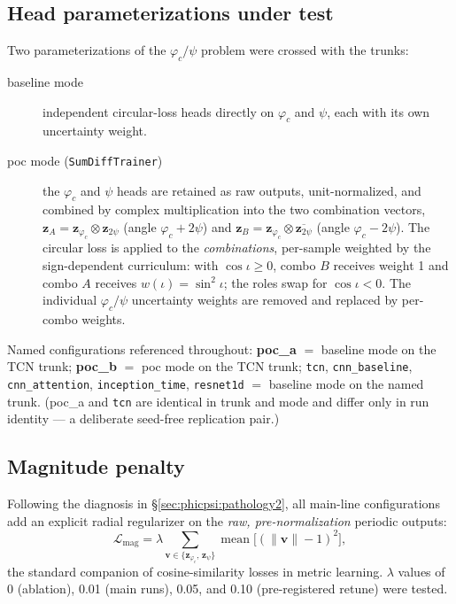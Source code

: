 \documentclass[11pt]{article}
\begin{document}
\subsection{Head parameterizations under test}
\label{sec:phicpsi:modes}

Two parameterizations of the $\varphi_c/\psi$ problem were crossed with the trunks:
\begin{description}
\item[baseline mode] independent circular-loss heads directly on $\varphi_c$ and $\psi$, each with its own uncertainty weight.
\item[poc mode (\texttt{SumDiffTrainer})] the $\varphi_c$ and $\psi$ heads are retained as raw outputs, unit-normalized, and combined by complex multiplication into the two combination vectors, $\mathbf{z}_A = \mathbf{z}_{\varphi_c} \otimes \mathbf{z}_{2\psi}$ (angle $\varphi_c + 2\psi$) and $\mathbf{z}_B = \mathbf{z}_{\varphi_c} \otimes \overline{\mathbf{z}_{2\psi}}$ (angle $\varphi_c - 2\psi$).
The circular loss is applied to the \emph{combinations}, per-sample weighted by the sign-dependent curriculum: with $\cos\iota \ge 0$, combo $B$ receives weight 1 and combo $A$ receives $w(\iota) = \sin^2\iota$; the roles swap for $\cos\iota < 0$.
The individual $\varphi_c/\psi$ uncertainty weights are removed and replaced by per-combo weights.
\end{description}

Named configurations referenced throughout: \textbf{poc\_a} $=$ baseline mode on the TCN trunk; \textbf{poc\_b} $=$ poc mode on the TCN trunk; \texttt{tcn}, \texttt{cnn\_baseline}, \texttt{cnn\_attention}, \texttt{inception\_time}, \texttt{resnet1d} $=$ baseline mode on the named trunk.
(poc\_a and \texttt{tcn} are identical in trunk and mode and differ only in run identity --- a deliberate seed-free replication pair.)

\subsection{Magnitude penalty}
\label{sec:phicpsi:magpen}

Following the diagnosis in \S\ref{sec:phicpsi:pathology2}, all main-line configurations add an explicit radial regularizer on the \emph{raw, pre-normalization} periodic outputs:
\begin{equation}
    \mathcal{L}_{\mathrm{mag}}
    = \lambda \sum_{\mathbf{v} \in \{\mathbf{z}_{\varphi_c},\, \mathbf{z}_{\psi}\}}
    \operatorname{mean}\!\bigl[(\lVert\mathbf{v}\rVert - 1)^2\bigr],
    \label{eq:magpen}
\end{equation}
the standard companion of cosine-similarity losses in metric learning.
$\lambda$ values of 0 (ablation), 0.01 (main runs), 0.05, and 0.10 (pre-registered retune) were tested.
\end{document}
